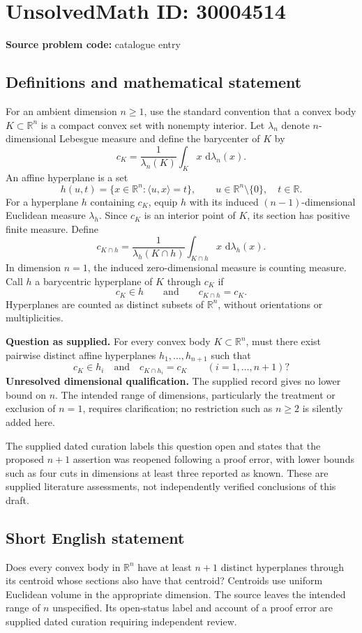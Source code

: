 \documentclass[11pt]{article}
\newcommand{\R}{\mathbb{R}}
\newcommand{\dd}{\,\mathrm{d}}
\begin{document}
\section*{UnsolvedMath ID: 30004514}
\textbf{Source problem code:} catalogue entry
\subsection{Definitions and mathematical statement}
For an ambient dimension \(n\geq 1\), use the standard convention that a convex body \(K\subset\R^n\) is a compact convex set with nonempty interior. Let \(\lambda_n\) denote \(n\)-dimensional Lebesgue measure and define the barycenter of \(K\) by
\[
 c_K=\frac{1}{\lambda_n(K)}\int_K x\,\dd\lambda_n(x).
\]
An affine hyperplane is a set
\[
 h(u,t)=\{x\in\R^n:\langle u,x\rangle=t\},
 \qquad u\in\R^n\setminus\{0\},\quad t\in\R.
\]
For a hyperplane \(h\) containing \(c_K\), equip \(h\) with its induced \((n-1)\)-dimensional Euclidean measure \(\lambda_h\). Since \(c_K\) is an interior point of \(K\), its section has positive finite measure. Define
\[
 c_{K\cap h}=\frac{1}{\lambda_h(K\cap h)}
 \int_{K\cap h}x\,\dd\lambda_h(x).
\]
In dimension \(n=1\), the induced zero-dimensional measure is counting measure. Call \(h\) a barycentric hyperplane of \(K\) through \(c_K\) if
\[
 c_K\in h\qquad\text{and}\qquad c_{K\cap h}=c_K.
\]
Hyperplanes are counted as distinct subsets of \(\R^n\), without orientations or multiplicities.

\textbf{Question as supplied.} For every convex body \(K\subset\R^n\), must there exist pairwise distinct affine hyperplanes \(h_1,\ldots,h_{n+1}\) such that
\[
 c_K\in h_i\quad\text{and}\quad c_{K\cap h_i}=c_K
 \qquad (i=1,\ldots,n+1)?
\]
\textbf{Unresolved dimensional qualification.} The supplied record gives no lower bound on \(n\). The intended range of dimensions, particularly the treatment or exclusion of \(n=1\), requires clarification; no restriction such as \(n\geq2\) is silently added here.

The supplied dated curation labels this question open and states that the proposed \(n+1\) assertion was reopened following a proof error, with lower bounds such as four cuts in dimensions at least three reported as known. These are supplied literature assessments, not independently verified conclusions of this draft.
\subsection{Short English statement}
Does every convex body in \(\R^n\) have at least \(n+1\) distinct hyperplanes through its centroid whose sections also have that centroid? Centroids use uniform Euclidean volume in the appropriate dimension. The source leaves the intended range of \(n\) unspecified. Its open-status label and account of a proof error are supplied dated curation requiring independent review.
\end{document}
